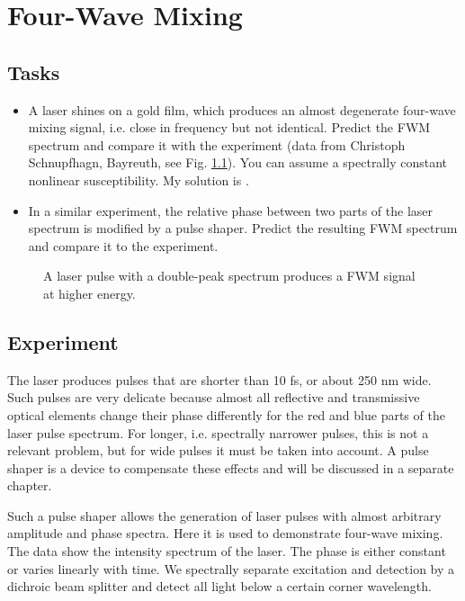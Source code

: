 \renewcommand{\lastmod}{June 21, 2024}
\renewcommand{\chapterauthors}{Markus Lippitz}


\chapter{Four-Wave Mixing}


\section{Tasks}

\begin{itemize}
\item A laser shines on a gold film, which produces an almost degenerate four-wave mixing signal, i.e. close in frequency but not identical. Predict the FWM spectrum and compare it with the experiment (data from Christoph Schnupfhagn, Bayreuth, see Fig. \ref{fig:fwm_example}). You can assume a spectrally constant nonlinear susceptibility. My solution is .

\item In a similar experiment, the relative phase between two parts of the laser spectrum is modified by a pulse shaper. Predict the resulting FWM spectrum and compare it to the experiment.
\end{itemize}

\begin{figure}
  \caption{A laser pulse with a double-peak spectrum produces a FWM signal at higher energy. \label{fig:fwm_example} }
\end{figure}

\section{Experiment}

The laser produces pulses that are shorter than 10 fs, or about 250 nm wide. Such pulses are very delicate because almost all reflective and transmissive optical elements change their phase differently for the red and blue parts of the laser pulse spectrum. For longer, i.e. spectrally narrower pulses, this is not a relevant problem, but for wide pulses it must be taken into account. A pulse shaper is a device to compensate these effects and will be discussed in a separate chapter.

Such a pulse shaper allows the generation of laser pulses with almost arbitrary amplitude and phase spectra. Here it is used to demonstrate four-wave mixing. The data show the intensity spectrum of the laser. The phase is either constant or varies linearly with time.
We spectrally separate excitation and detection by a dichroic beam splitter and detect all light below a certain corner wavelength. 


